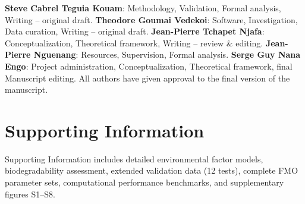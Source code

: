\documentclass[11pt,a4paper]{article}
\begin{document}
\textbf{Steve Cabrel Teguia Kouam}: Methodology, Validation, Formal analysis, Writing -- original draft. \textbf{Theodore Goumai Vedekoi}: Software, Investigation, Data curation, Writing -- original draft. \textbf{Jean-Pierre Tchapet Njafa}: Conceptualization, Theoretical framework, Writing -- review \& editing. \textbf{Jean-Pierre Nguenang}: Resources, Supervision, Formal analysis. \textbf{Serge Guy Nana Engo}: Project administration, Conceptualization, Theoretical framework, final Manuscript editing. All authors have given approval to the final version of the manuscript.




\section*{Supporting Information}

Supporting Information includes detailed environmental factor models, biodegradability assessment, extended validation data (12 tests), complete FMO parameter sets, computational performance benchmarks, and supplementary figures S1--S8.

\end{document}
